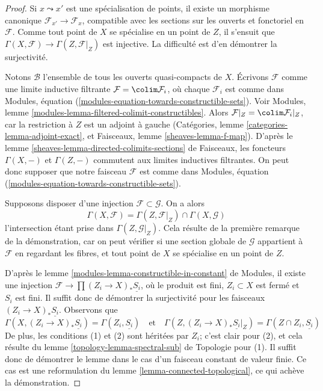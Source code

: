 \begin{proof}
Si $x \leadsto x'$ est une spécialisation de points, il existe un
morphisme canonique $\mathcal{F}_{x'} \to \mathcal{F}_x$, compatible avec les
sections sur les ouverts et fonctoriel en $\mathcal{F}$. Comme tout point
de $X$ se spécialise en un point de $Z$, il s'ensuit que
$\Gamma(X, \mathcal{F}) \to \Gamma(Z, \mathcal{F}|_Z)$ est injective.
La difficulté est d'en démontrer la surjectivité.

\medskip\noindent
Notons $\mathcal{B}$ l'ensemble de tous les ouverts quasi-compacts de $X$.
Écrivons $\mathcal{F}$ comme une limite inductive filtrante $\mathcal{F} = \colim \mathcal{F}_i$,
où chaque $\mathcal{F}_i$ est comme dans
Modules, équation (\ref{modules-equation-towards-constructible-sets}).
Voir Modules, lemme \ref{modules-lemma-filtered-colimit-constructibles}.
Alors $\mathcal{F}|_Z = \colim \mathcal{F}_i|_Z$, car la restriction à $Z$
est un adjoint à gauche (Catégories, lemme \ref{categories-lemma-adjoint-exact}, et
Faisceaux, lemme \ref{sheaves-lemma-f-map}).
D'après le lemme \ref{sheaves-lemma-directed-colimits-sections} de Faisceaux,
les foncteurs $\Gamma(X, -)$ et $\Gamma(Z, -)$ commutent aux limites inductives filtrantes.
On peut donc supposer que notre faisceau $\mathcal{F}$ est comme dans
Modules, équation (\ref{modules-equation-towards-constructible-sets}).

\medskip\noindent
Supposons disposer d'une injection $\mathcal{F} \subset \mathcal{G}$.
On a alors
$$
\Gamma(X, \mathcal{F}) =
\Gamma(Z, \mathcal{F}|_Z) \cap \Gamma(X, \mathcal{G})
$$
l'intersection étant prise dans $\Gamma(Z, \mathcal{G}|_Z)$.
Cela résulte de la première remarque de la démonstration, car on peut vérifier
si une section globale de $\mathcal{G}$ appartient à $\mathcal{F}$ en regardant
les fibres, et tout point de $X$ se spécialise en un point de $Z$.

\medskip\noindent
D'après le lemme \ref{modules-lemma-constructible-in-constant} de Modules,
il existe une injection $\mathcal{F} \to \prod (Z_i \to X)_*\underline{S_i}$,
où le produit est fini, $Z_i \subset X$ est fermé et $S_i$ est fini.
Il suffit donc de démontrer la surjectivité pour les faisceaux
$(Z_i \to X)_*\underline{S_i}$. Observons que
$$
\Gamma(X, (Z_i \to X)_*\underline{S_i}) = \Gamma(Z_i, \underline{S_i})
\quad\text{et}\quad
\Gamma(Z, (Z_i \to X)_*\underline{S_i}|_Z) =
\Gamma(Z \cap Z_i, \underline{S_i})
$$
De plus, les conditions (1) et (2) sont héritées par $Z_i$; c'est clair
pour (2), et cela résulte du
lemme \ref{topology-lemma-spectral-sub} de Topologie pour (1). Il
suffit donc de démontrer le lemme dans le cas d'un faisceau constant de valeur finie.
Ce cas est une reformulation du lemme \ref{lemma-connected-topological},
ce qui achève la démonstration.
\end{proof}

